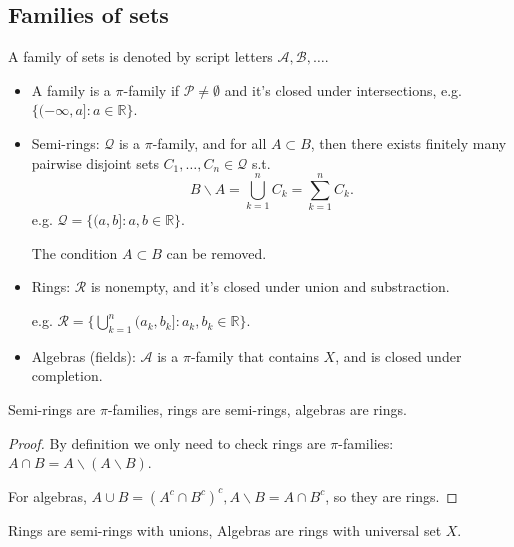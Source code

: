 \subsection{Families of sets}
\label{sub:Families of sets}
\begin{definition}
	A family of sets is denoted by script letters $\mathscr{A},\mathscr{B},\dots$.

	\begin{itemize}
		\item A family is a $\pi$-family if  $\mathscr{P}\ne \emptyset$ and
			it's closed under intersections, e.g.
			$\{(-\infty, a]: a\in \mathbb{R}\}$.
		\item Semi-rings: $\mathscr{Q}$ is a $\pi$-family, and for all
			$A \subset B$, then there exists finitely many pairwise disjoint sets
			$C_1,\dots,C_n\in \mathscr{Q}$ s.t.
			\[
			B\backslash A = \bigcup_{k=1}^n C_k = \sum_{k=1}^n C_k.
			\]
			e.g. $\mathscr{Q}= \{(a,b]:a,b\in \mathbb{R}\}$.
			\begin{remark}
				The condition $A \subset B$ can be removed.
			\end{remark}
		\item Rings: $\mathscr{R}$ is nonempty, and it's closed under
			union and substraction.

			e.g. $\mathscr{R} = \{\bigcup_{k=1}^n (a_k,b_k]:a_k,b_k\in \mathbb{R}\}$.
		\item Algebras (fields): $\mathscr{A}$ is a $\pi$-family that contains
			$X$, and is closed under completion.
	\end{itemize}
\end{definition}

\begin{proposition}
	Semi-rings are $\pi$-families, rings are semi-rings, algebras are rings.
\end{proposition}
\begin{proof}[Proof]
    By definition we only need to check rings are $\pi$-families:
	$A\cap B = A\backslash (A\backslash B)$.

	For algebras, $A\cup B = (A^c\cap B^c)^c, A\backslash B = A\cap B^c$,
	so they are rings.
\end{proof}
\begin{remark}
    Rings are semi-rings with unions, Algebras are rings with universal set $X$.
\end{remark}

